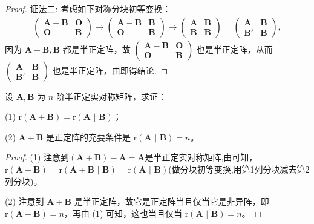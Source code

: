 \documentclass[../../main.tex]{subfiles}
\begin{document}
\begin{proof}
{\color{blue}证法二:}
考虑如下对称分块初等变换：
\begin{align*}
\begin{pmatrix}
\boldsymbol{A}-\boldsymbol{B} & \boldsymbol{O} \\
\boldsymbol{O} & \boldsymbol{B}
\end{pmatrix}\to
\begin{pmatrix}
\boldsymbol{A}-\boldsymbol{B} & \boldsymbol{B} \\
\boldsymbol{O} & \boldsymbol{B}
\end{pmatrix}\to
\begin{pmatrix}
\boldsymbol{A} & \boldsymbol{B} \\
\boldsymbol{B} & \boldsymbol{B}
\end{pmatrix}=\begin{pmatrix}
\boldsymbol{A} & \boldsymbol{B} \\
\boldsymbol{B}' & \boldsymbol{B}
\end{pmatrix},
\end{align*}
因为 $\boldsymbol{A}-\boldsymbol{B},\boldsymbol{B}$ 都是半正定阵，故 $\begin{pmatrix}
\boldsymbol{A}-\boldsymbol{B} & \boldsymbol{O} \\
\boldsymbol{O} & \boldsymbol{B}
\end{pmatrix}$ 也是半正定阵，从而 $\begin{pmatrix}
\boldsymbol{A} & \boldsymbol{B} \\
\boldsymbol{B}' & \boldsymbol{B}
\end{pmatrix}$ 也是半正定阵，由即得结论.
\end{proof}

\begin{proposition}\label{proposition:例8.77}
设 $\boldsymbol{A},\boldsymbol{B}$ 为 $n$ 阶半正定实对称矩阵，求证：

(1) $\mathrm{r}(\boldsymbol{A}+\boldsymbol{B})=\mathrm{r}(\boldsymbol{A}\,\,|\,\,\boldsymbol{B})$；

(2) $\boldsymbol{A}+\boldsymbol{B}$ 是正定阵的充要条件是 $\mathrm{r}(\boldsymbol{A}\,\,|\,\,\boldsymbol{B})=n$。
\end{proposition}
\begin{proof}
(1) 注意到$(\boldsymbol{A}+\boldsymbol{B})-\boldsymbol{A}=\boldsymbol{A}$是半正定实对称矩阵,由可知，$\mathrm{r}(\boldsymbol{A}+\boldsymbol{B})=\mathrm{r}(\boldsymbol{A}+\boldsymbol{B}\,\,|\,\,\boldsymbol{B})=\mathrm{r}(\boldsymbol{A}\,\,|\,\,\boldsymbol{B})$(做分块初等变换,用第1列分块减去第2列分块)。

(2) 注意到 $\boldsymbol{A}+\boldsymbol{B}$ 是半正定阵，故它是正定阵当且仅当它是非异阵，即 $\mathrm{r}(\boldsymbol{A}+\boldsymbol{B})=n$，再由 (1) 可知，这也当且仅当 $\mathrm{r}(\boldsymbol{A}\,\,|\,\,\boldsymbol{B})=n$。
\end{proof}
\end{document}
